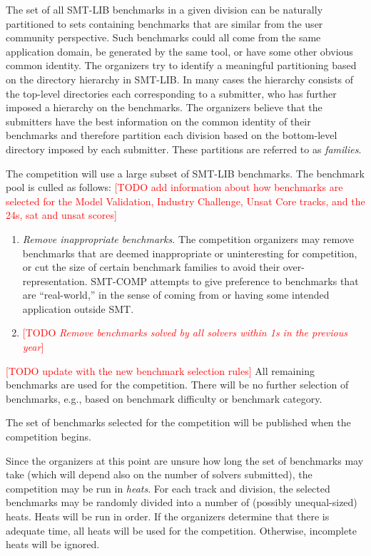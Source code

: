 \documentclass[12pt]{article}
\newcommand{\rem}[1]{\textcolor{red}{[#1]}}
\newcommand{\todo}[1]{\rem{TODO #1}}
\newcommand{\ucore}{Unsat Core\xspace}
\newcommand{\mval}{Model Validation\xspace}
\newcommand{\challenge}{Industry Challenge\xspace}
\begin{document}
\header{Benchmark demographics. \todo{check}}
%
The set of all SMT-LIB benchmarks in a given division can be naturally
partitioned to sets containing benchmarks that are similar from the user
community perspective.  Such benchmarks could all come from the same
application domain, be generated by the same tool, or have some other
obvious common identity.
%
The organizers try to identify a meaningful partitioning based on the
directory hierarchy in SMT-LIB.  In many cases the hierarchy consists of
the top-level directories each corresponding to a submitter, who has
further imposed a hierarchy on the benchmarks.
%
The organizers believe that the submitters have the best information on
the common identity of their benchmarks and therefore partition each
division based on the bottom-level directory imposed by each submitter.
These partitions are referred to as \emph{families}.

%
The competition will use a large subset of SMT-LIB benchmarks.  The
benchmark pool is culled as follows:
\todo{add information about how benchmarks are selected for the \mval,
\challenge, \ucore tracks, and the 24s, sat and unsat scores}
\begin{enumerate}
\item \emph{Remove inappropriate benchmarks.} The competition
  organizers may remove benchmarks that are deemed inappropriate or
  uninteresting for competition, or cut the size of certain benchmark
  families to avoid their over-representation.  SMT-COMP attempts to
  give preference to benchmarks that are ``real-world,'' in the sense
  of coming from or having some intended application outside SMT.
\item \todo{\emph{Remove benchmarks solved by all solvers within 1s in the previous year}}
\end{enumerate}
%
\todo{update with the new benchmark selection rules}
All remaining benchmarks are used for the competition.  There will be
no further selection of benchmarks, e.g., based on benchmark
difficulty or benchmark category.

The set of benchmarks selected for the competition will be published
when the competition begins.

%
Since the organizers at this point are unsure how long the set of
benchmarks may take (which will depend also on the number of solvers
submitted), the competition may be run in \emph{heats}.  For each
track and division, the selected benchmarks may be randomly divided
into a number of (possibly unequal-sized) heats.  Heats will be run in
order.  If the organizers determine that there is adequate time, all
heats will be used for the competition.  Otherwise, incomplete heats
will be ignored.
\end{document}
